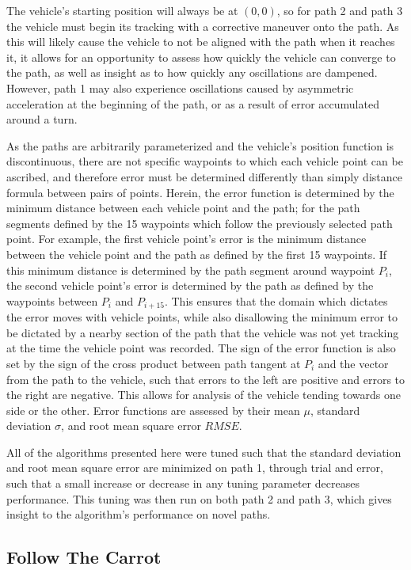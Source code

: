 \documentclass[mla7]{mla}
\begin{document}
\begin{paper}
The vehicle's starting position will always be at $(0,0)$, so for path 2 and path 3 the vehicle must begin its tracking with a corrective maneuver onto the path. As this will likely cause the vehicle to not be aligned with the path when it reaches it, it allows for an opportunity to assess how quickly the vehicle can converge to the path, as well as insight as to how quickly any oscillations are dampened. However, path 1 may also experience oscillations caused by asymmetric acceleration at the beginning of the path, or as a result of error accumulated around a turn.

As the paths are arbitrarily parameterized and the vehicle's position function is discontinuous, there are not specific waypoints to which each vehicle point can be ascribed, and therefore error must be determined differently than simply distance formula between pairs of points. Herein, the error function is determined by the minimum distance between each vehicle point and the path; for the path segments defined by the 15 waypoints which follow the previously selected path point. For example, the first vehicle point's error is the minimum distance between the vehicle point and the path as defined by the first 15 waypoints. If this minimum distance is determined by the path segment around waypoint $P_i$, the second vehicle point's error is determined by the path as defined by the waypoints between $P_i$ and $P_{i+15}$. This ensures that the domain which dictates the error moves with vehicle points, while also disallowing the minimum error to be dictated by a nearby section of the path that the vehicle was not yet tracking at the time the vehicle point was recorded. The sign of the error function is also set by the sign of the cross product between path tangent at $P_i$ and the vector from the path to the vehicle, such that errors to the left are positive and errors to the right are negative. This allows for analysis of the vehicle tending towards one side or the other. Error functions are assessed by their mean $\mu$, standard deviation $\sigma$, and root mean square error $RMSE$.

All of the algorithms presented here were tuned such that the standard deviation and root mean square error are minimized on path 1, through trial and error, such that a small increase or decrease in any tuning parameter decreases performance. This tuning was then run on both path 2 and path 3, which gives insight to the algorithm's performance on novel paths.

\subsection{Follow The Carrot}


\end{paper}
\end{document}
